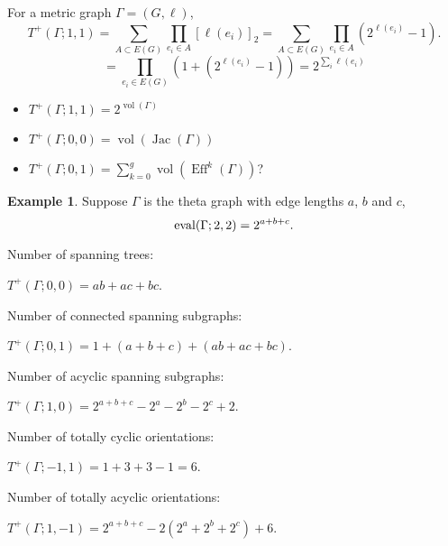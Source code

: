 \documentclass{amsart}
\theoremstyle{definition}
\newtheorem{eg}[thm]{Example}
\DeclareMathOperator{\Eff}{Eff}
\DeclareMathOperator{\Jac}{Jac}
\DeclareMathOperator{\vol}{vol}
\begin{document}
For a metric graph $\Gamma = (G,\ell)$,
\[ T^+(\Gamma;1,1) = \sum_{A \subset E(G)} \prod_{e_i \in A} [\ell(e_i)]_{2}
= \sum_{A \subset E(G)} \prod_{e_i \in A} (2^{\ell(e_i)} - 1) .\]
\[ = \prod_{e_i \in E(G)} (1 + (2^{\ell(e_i)} - 1))
 = 2^{\sum_i \ell(e_i)}\]
\begin{itemize}
\item 
$T^+(\Gamma;1,1) = 2^{\vol(\Gamma)}$

\item 
$T^+(\Gamma;0,0) = \vol(\Jac(\Gamma))$

\item 
$T^+(\Gamma;0,1) = \sum_{k=0}^g \vol(\Eff^k(\Gamma))$?

\end{itemize}

\begin{eg}
Suppose $\Gamma$ is the theta graph with edge lengths $a$, $b$ and $c$,
\[ {\rm eval}(\Gamma; 2,2) = 2^{a+b+c} .\]

Number of spanning trees:

$T^+(\Gamma; 0,0) = ab + ac + bc$.

Number of connected spanning subgraphs:

$T^+(\Gamma; 0,1) = 1 + (a + b + c) + (ab + ac + bc)$.

Number of acyclic spanning subgraphs:

$T^+(\Gamma; 1,0) 
= 2^{a+b+c} - 2^a - 2^b - 2^c + 2$.

Number of totally cyclic orientations:

$T^+(\Gamma; -1,1) = 1 + 3 + 3 - 1 = 6$.

Number of totally acyclic orientations:

$T^+(\Gamma; 1,-1) = 2^{a+b+c} - 2(2^a + 2^b + 2^c) + 6$.
\end{eg}
\end{document}
